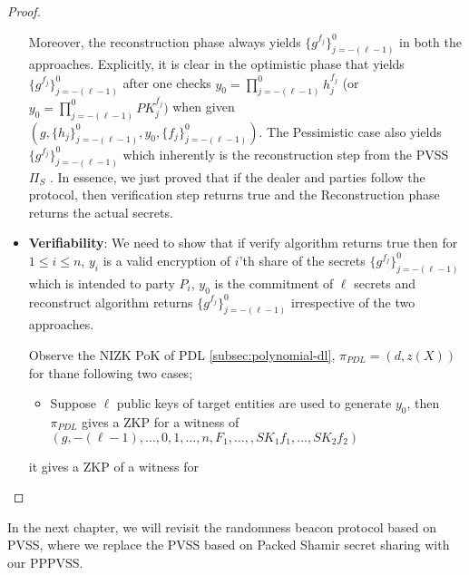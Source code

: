 \begin{proof}
\begin{itemize}
      Moreover, the reconstruction phase always yields $\{g^{f_j}\}_{j=-(\ell-1)}^0$ in both the approaches. Explicitly, it is 
      clear in the optimistic phase that yields $\{g^{f_j}\}_{j=-(\ell-1)}^0$ after one checks $y_0=\prod_{j=-(\ell-1)}^{0}h_j^{f_j}$ (or $y_0=\prod_{j=-(\ell-1)}^0PK_j^{f_j})$ 
      when given $(g,\{h_j\}_{j=-(\ell-1)}^0,y_0,\{f_j\}_{j=-(\ell-1)}^0)$. The Pessimistic case also yields 
      $\{g^{f_j}\}_{j=-(\ell-1)}^0$ which inherently is the reconstruction step from the PVSS $\Pi_S$ \cite{cryptoeprint:2023/1669}. 
      In essence, we just proved that if the dealer and parties follow the protocol, then verification step returns 
      true and the Reconstruction phase returns the actual secrets.
    \item \textbf{Verifiability}: We need to show that if verify algorithm returns true then for $1\leq i\leq n$, 
      $y_i$ is a valid encryption of $i$'th share of the secrets $\{g^{f_j}\}_{j=-(\ell-1)}^0$ which is intended to party $P_i$, $y_0$ 
      is the commitment of $\ell$ secrets and reconstruct algorithm returns $\{g^{f_j}\}_{j=-(\ell-1)}^0$ irrespective of 
      the two approaches.\par

      Observe the NIZK PoK of PDL \ref{subsec:polynomial-dl}, $\pi_{PDL}=(d,z(X))$ for thane following two cases;
      \begin{itemize}
        \item Suppose $\ell$ public keys of target entities are used to generate $y_0$, then $\pi_{PDL}$ gives a ZKP 
          for a witness of $(g,-(\ell-1),\dots,0,1,\dots,n,F_1,\dots,,SK_1f_1,\dots,SK_2f_2)$
      \end{itemize}
      it gives a ZKP of a witness for 
      
  \end{itemize}
\end{proof}
 
In the next chapter, we will revisit the randomness beacon \cite{cryptoeprint:2020/644} protocol based on PVSS, 
where we replace the PVSS based on Packed Shamir secret sharing with our PPPVSS. 

